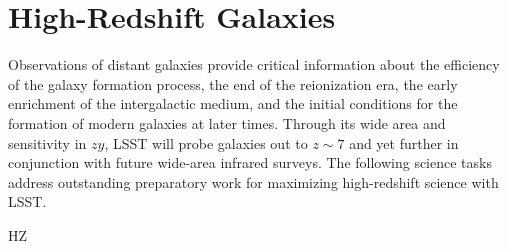 \section{High-Redshift Galaxies}\label{sec:tasks:high_z}  

{\justify
Observations of distant galaxies provide critical information
about the efficiency of the galaxy formation process, the end
of the reionization era, the early enrichment of the intergalactic
medium, and the initial conditions for the formation of modern
galaxies at later times. Through its wide area and sensitivity
in $zy$, LSST will probe galaxies out to $z\sim7$ and 
yet further in conjunction with future wide-area infrared surveys.
The following science tasks address outstanding preparatory work
for maximizing high-redshift science with LSST.

\begin{tasklist}{HZ}


\end{tasklist}}
